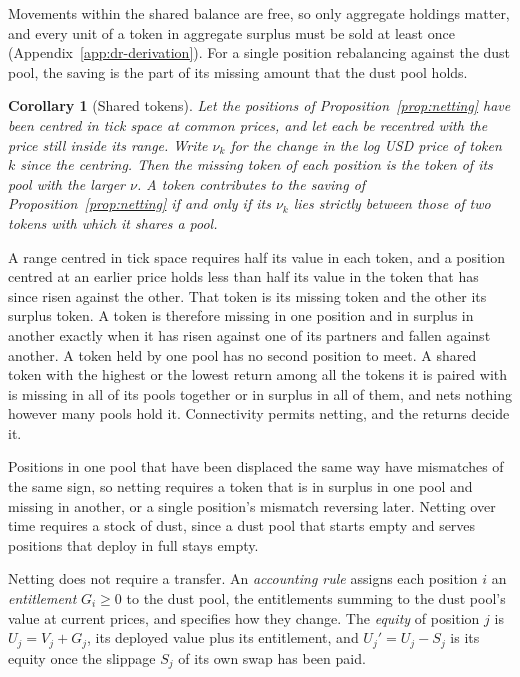 \documentclass[11pt,a4paper]{article}
\DeclareRobustCommand{\acr}[1]{{\addfontfeatures{Letters=UppercaseSmallCaps,LetterSpace=2}#1}}
\theoremstyle{siphon}
\newtheorem{corollary}{Corollary}[theorem]
\begin{document}
\noindent Movements within the shared balance are free, so only aggregate holdings matter, and every unit of a token in aggregate surplus must be sold at least once (Appendix~\ref{app:dr-derivation}). For a single position rebalancing against the dust pool, the saving is the part of its missing amount that the dust pool holds.

\begin{corollary}[Shared tokens]\label{cor:shared}
Let the positions of Proposition~\ref{prop:netting} have been centred in tick space at common prices, and let each be recentred with the price still inside its range. Write $\nu_k$ for the change in the log \acr{USD} price of token $k$ since the centring. Then the missing token of each position is the token of its pool with the larger $\nu$. A token contributes to the saving of Proposition~\ref{prop:netting} if and only if its $\nu_k$ lies strictly between those of two tokens with which it shares a pool.
\end{corollary}

\noindent A range centred in tick space requires half its value in each token, and a position centred at an earlier price holds less than half its value in the token that has since risen against the other. That token is its missing token and the other its surplus token. A token is therefore missing in one position and in surplus in another exactly when it has risen against one of its partners and fallen against another. A token held by one pool has no second position to meet. A shared token with the highest or the lowest return among all the tokens it is paired with is missing in all of its pools together or in surplus in all of them, and nets nothing however many pools hold it. Connectivity permits netting, and the returns decide it.

Positions in one pool that have been displaced the same way have mismatches of the same sign, so netting requires a token that is in surplus in one pool and missing in another, or a single position's mismatch reversing later. Netting over time requires a stock of dust, since a dust pool that starts empty and serves positions that deploy in full stays empty.

Netting does not require a transfer. An \emph{accounting rule} assigns each position $i$ an \emph{entitlement} $G_i \geq 0$ to the dust pool, the entitlements summing to the dust pool's value at current prices, and specifies how they change. The \emph{equity} of position $j$ is $U_j = V_j + G_j$, its deployed value plus its entitlement, and $U_j' = U_j - S_j$ is its equity once the slippage $S_j$ of its own swap has been paid.
\end{document}
